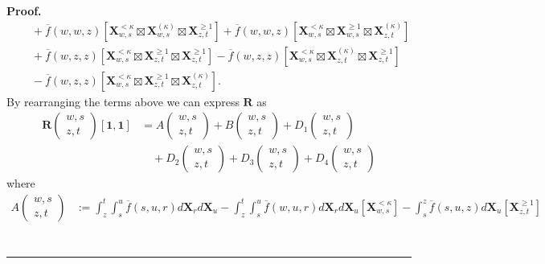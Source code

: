 \documentclass{article}%
\newenvironment{proof}[1][Proof]{\noindent\textbf{#1.} }{\ \rule{0.5em}{0.5em}}
\begin{document}
\begin{proof}
\begin{align*}
& \quad + \overline{f}(w,w,z)\left[ \mathbf{X}^{< \kappa}_{w,s} \boxtimes \mathbf{X}^{(\kappa)}_{w,s} \boxtimes \mathbf{X}^{\ge 1}_{z,t}\right] +  \overline{f}(w,w,z)\left[ \mathbf{X}^{< \kappa}_{w,s} \boxtimes \mathbf{X}^{\ge 1}_{w,s} \boxtimes \mathbf{X}^{(\kappa)}_{z,t}\right]\\
& \quad +\overline f(w,z,z) \left[\mathbf{X}^{< \kappa}_{w,s} \boxtimes \mathbf{X}^{\geq 1}_{z,t} \boxtimes \mathbf{X}^{\geq 1}_{z,t}\right] -\overline f(w,z,z) \left[\mathbf{X}^{< \kappa}_{w,s} \boxtimes \mathbf{X}^{(\kappa)}_{z,t} \boxtimes \mathbf{X}^{\geq 1}_{z,t}\right]\\
& \quad -\overline f(w,z,z) \left[\mathbf{X}^{< \kappa}_{w,s} \boxtimes \mathbf{X}^{\geq 1}_{z,t} \boxtimes \mathbf{X}^{(\kappa)}_{z,t}\right] .
\end{align*}
By rearranging the terms above we can express $\mathbf{R}$ as
\begin{align*}
\mathbf{R} \begin{pmatrix} w,s \\ z,t \end{pmatrix}[\mathbf{1}, \mathbf{1}]
&= A\begin{pmatrix} w,s \\ z,t \end{pmatrix} + B\begin{pmatrix} w,s \\ z,t \end{pmatrix} + D_1\begin{pmatrix} w,s \\ z,t \end{pmatrix}\\
& \quad  + D_2\begin{pmatrix} w,s \\ z,t \end{pmatrix} + D_3\begin{pmatrix} w,s \\ z,t \end{pmatrix} + D_4\begin{pmatrix} w,s \\ z,t \end{pmatrix}
\end{align*}
where 
\begin{align*}
A\begin{pmatrix} w,s \\ z,t \end{pmatrix} &:= \int_z^t \int_s^u  \overline f(s,u,r) d\mathbf{X}_r d\mathbf{X}_u  - \int_z^t \int_s^u \overline f(w,u,r) d\mathbf{X}_r d\mathbf{X}_u \left[\mathbf{X}^{< \kappa}_{w,s} \right]  - \int_s^z  \overline f(s,u,z)  d\mathbf{X}_u \left[\mathbf{X}^{\ge 1}_{z,t}\right] \\

\end{align*}
\end{proof}
\end{document}
